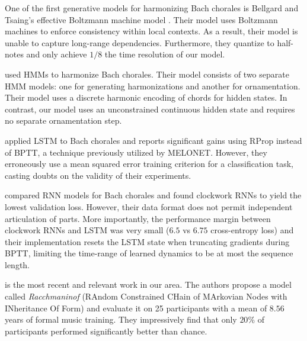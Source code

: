 One of the first generative models for harmonizing Bach chorales is Bellgard
and Tsaing's effective Boltzmann machine model \citep{bellgard1994harmonizing}. Their model
uses Boltzmann machines to enforce consistency within local contexts. As a result,
their model is unable to capture long-range dependencies. Furthermore, they quantize
to half-notes and only achieve $1/8$ the time resolution of our model.

\citet{Allan2005} used HMMs to harmonize Bach chorales. Their model consists of
two separate HMM models: one for generating harmonizations and another for
ornamentation. Their model uses a discrete harmonic encoding of chords for
hidden states. In contrast, our model uses an unconstrained continuous hidden
state and requires no separate ornamentation step.

\citet{Liu2014} applied LSTM to Bach chorales and reports significant gains
using RProp instead of BPTT, a technique previously utilized by
MELONET\citep{feulner1994melonet}. However, they erroneously use a mean squared
error training criterion for a classification task, casting doubts on the
validity of their experiments.

\citet{Brien2016} compared RNN models for Bach chorales and found clockwork RNNs to
yield the lowest validation loss. However, their data format does not permit
independent articulation of parts. More importantly, the performance margin between
clockwork RNNs and LSTM was very small ($6.5$ vs $6.75$ cross-entropy loss) and their
implementation resets the LSTM state when truncating gradients during BPTT, limiting the
time-range of learned dynamics to be at most the sequence length.

\citet{collins2016developing} is the most recent and relevant work in our area.
The authors propose a model called \emph{Racchmaninof} (RAndom Constrained
CHain of MArkovian Nodes with INheritance Of Form) and evaluate it on 25
participants with a mean of $8.56$ years of formal music training. They
impressively find that only $20\%$ of participants performed significantly
better than chance.
